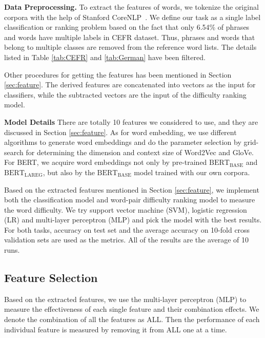 \textbf{Data Preprocessing.} To extract the features of words, we tokenize the original corpora with the help of Stanford CoreNLP~\cite{manning2014stanford}.
We define our task as a single label classification or ranking problem based on the fact that only 6.54\% of phrases and words have multiple labels in CEFR dataset.
Thus, phrases and words that belong to multiple classes are removed from the reference word lists. 
The details listed in Table \ref{tab:CEFR} and \ref{tab:German} have been filtered. 

Other procedures for getting the features has been mentioned in Section \ref{sec:feature}.
The derived features are concatenated into vectors as the input for classifiers, while the subtracted vectors are the input of the difficulty ranking model.

\textbf{Model Details}
There are totally 10 features
we considered to use, and they are discussed in Section \ref{sec:feature}. As for word embedding, 
we use different algorithms to generate word embeddings and do the parameter selection by grid-search for determining the dimension and context size
of Word2Vec and GloVe.
For BERT, we acquire word embeddings not only by pre-trained $\text{BERT}_\text{BASE}$ and $\text{BERT}_\text{LAREG}$, but also by the $\text{BERT}_\text{BASE}$  model trained with our own corpora.

Based on the extracted features mentioned in Section \ref{sec:feature}, we implement both the classification model and word-pair difficulty ranking model to measure the word difficulty.
We try support vector machine (SVM), logistic regression (LR) and multi-layer perceptron (MLP) and pick the model with the best results.
For both tasks, accuracy on test set and the average accuracy on 10-fold cross validation sets are used as the metrics. All of the results are the average of 10 runs.
\subsection{Feature Selection}
\label{sec:embedding}
Based on the extracted features, we use the multi-layer perceptron (MLP) to measure the effectiveness of each single feature and their combination effects.
We denote the combination of all the features as ALL.
Then the performance of each individual feature is measured by removing it from ALL one at a time.


